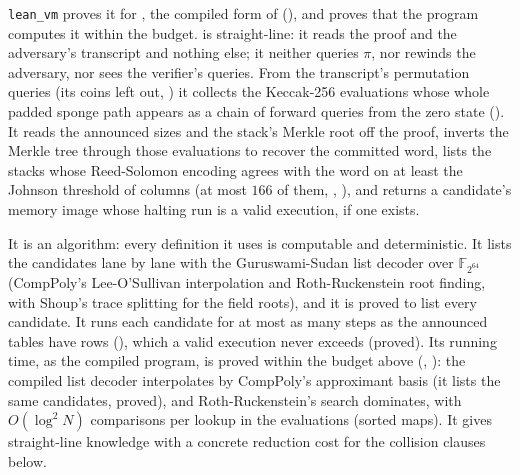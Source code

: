 \documentclass[11pt]{article}
\begin{document}
\texttt{lean\_vm} proves it for , the compiled form of
 (), and proves
that the program computes it within the budget.  is straight-line: it reads the proof and
the adversary's transcript and nothing else; it neither queries $\pi$, nor rewinds the adversary,
nor sees the verifier's queries. From the transcript's permutation queries (its coins left out,
) it collects the Keccak-256 evaluations whose
whole padded sponge path appears as a chain of forward queries from the zero state
(). It reads the announced sizes and the stack's Merkle root off the proof,
inverts the Merkle tree through those evaluations to recover the committed word, lists the stacks
whose Reed-Solomon encoding agrees with the word on at least the Johnson threshold of columns (at
most $166$ of them, , ), and returns a candidate's memory
image whose halting run is a valid execution, if one exists.

It is an algorithm: every definition it uses is computable and deterministic. It lists the
candidates lane by lane with the Guruswami-Sudan list decoder over $\mathbb{F}_{2^{64}}$
(CompPoly's Lee-O'Sullivan interpolation and Roth-Ruckenstein root finding, with Shoup's trace
splitting for the field roots), and it is proved to list every candidate. It runs each
candidate for at most as many steps as the announced tables have rows (), which a
valid execution never exceeds (proved). Its running time, as the compiled program, is proved
within the budget above (, ): the compiled list decoder
interpolates by CompPoly's approximant basis (it lists the same candidates, proved), and
Roth-Ruckenstein's search dominates, with $O(\log^2 N)$ comparisons per lookup in the evaluations (sorted maps). It gives straight-line knowledge with a
concrete reduction cost for the collision clauses below.
\end{document}
